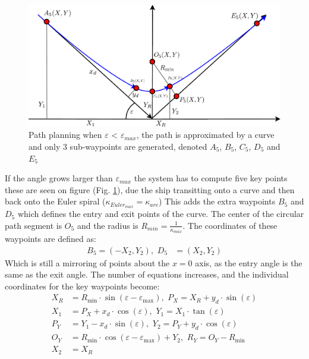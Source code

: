 \documentclass[a0,portrait]{a0poster}
\begin{document}
\begin{center}
{\paragraph{}
\begin{figure}
	\begin{center}
		\includegraphics[width=\threecolwidth]{img/5Points}    %
		\caption{Path planning when $\varepsilon$ < $\varepsilon_{max}$, the path is approximated by a curve and only 3 sub-waypoints are generated, denoted $A_5$, $B_5$, $C_5$, $D_5$ and $E_5$}  %
		\label{fig:5points}               
	\end{center}                                 %
\end{figure}

If the angle grows larger than $\varepsilon_{max}$ the system has to compute five key points these are seen on figure (Fig. \ref{fig:5points}), due the ship transitting onto a curve and then back onto the Euler spiral ($\kappa_{Euler_{max}} = \kappa_{arc}$) This adds the extra waypoints $B_5$ and $D_5$ which defines the entry and exit points of the curve. The center of the circular path segment is $O_5$ and the radius is $R_{min} = \frac{1}{\kappa_{max}}$. The coordinates of these waypoints are defined as:
\begin{align}
B_5 = (-X_2,Y_2),\,\, D_5 &= (X_2,Y_2)
\end{align}
Which is still a mirroring of points about the $x=0$ axis, as the entry angle is the same as the exit angle. The number of equations increases, and the individual coordinates for the key waypoints become:
\begin{align}
X_R &= R_\text{min} \cdot \sin(\varepsilon - \varepsilon _\text{max}),\,\, P_X = X_R + y_d \cdot \sin(\varepsilon)\\
X_1 &= P_X + x_d \cdot \cos(\varepsilon),\,\, Y_1 = X_1 \cdot \tan(\varepsilon)\\
P_Y &= Y_1 - x_d \cdot \sin(\varepsilon),\,\, Y_2 = P_Y + y_d \cdot \cos(\varepsilon)\\
O_Y &= R_\text{min} \cdot \cos(\varepsilon - \varepsilon _\text{max}) + Y_2,\,\, R_Y = O_Y - R_\text{min}\\
X_2 &= X_R
\end{align}

}
\end{center}
\end{document}
